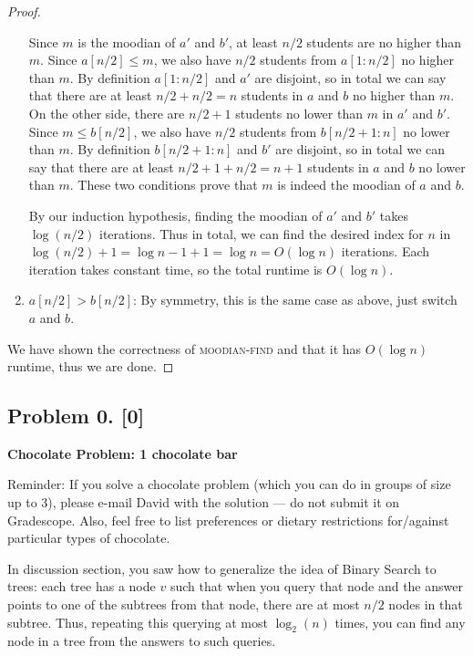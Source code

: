 \documentclass[10pt]{article}
\begin{document}
\begin{proof}
\begin{enumerate}
    Since \(m\) is the moodian of \(a'\) and \(b'\), at least \(n/2\) students are no higher than \(m\). Since \(a[n/2] \leq m\), we also have \(n/2\) students from \(a[1 : n/2]\) no higher than \(m\). By definition \(a[1 : n/2]\) and \(a'\) are disjoint, so in total we can say that there are at least \(n/2 + n/2 = n\) students in \(a\) and \(b\) no higher than \(m\). On the other side, there are \(n/2 + 1\) students no lower than \(m\) in \(a'\) and \(b'\). Since \(m \leq b[n/2]\), we also have \(n/2\) students from \(b[n/2+1:n]\) no lower than \(m\). By definition \(b[n/2 + 1 : n]\) and \(b'\) are disjoint, so in total we can say that there are at least \(n/2 + 1 + n/2 = n + 1\) students in \(a\) and \(b\) no lower than \(m\). These two conditions prove that \(m\) is indeed the moodian of \(a\) and \(b\).

    By our induction hypothesis, finding the moodian of \(a'\) and \(b'\) takes \(\log (n/2)\) iterations. Thus in total, we can find the desired index for \(n\) in \(\log (n/2) + 1 = \log n - 1 + 1 = \log n = O(\log n)\) iterations. Each iteration takes constant time, so the total runtime is \(O(\log n)\).

    \item \(a[n/2] > b[n/2]\): By symmetry, this is the same case as above, just switch \(a\) and \(b\).
  \end{enumerate}
  We have shown the correctness of \textsc{moodian-find} and that it has \(O(\log n)\) runtime, thus we are done.
\end{proof}


\subsection*{Problem 0. [0]}
\textbf{Chocolate Problem: 1 chocolate bar}

Reminder: If you solve a chocolate problem (which you can do in groups of size up to 3), please e-mail David with the solution --- do not submit it on Gradescope. Also, feel free to list preferences or dietary restrictions for/against particular types of chocolate.

In discussion section, you saw how to generalize the idea of Binary Search to trees: each tree has a node $v$ such that when you query that node and the answer points to one of the subtrees from that node, there are at most $n/2$ nodes in that subtree. Thus, repeating this querying at most $\log_2 (n)$ times, you can find any node in a tree from the answers to such queries.
\end{document}
